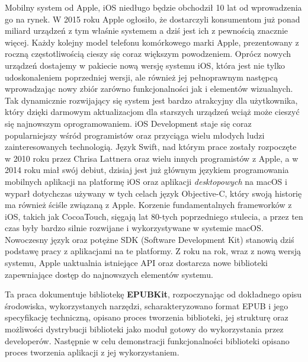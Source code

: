 Mobilny system od Apple, iOS niedługo będzie obchodził 10 lat od wprowadzenia go na rynek. W 2015 roku Apple ogłosiło, że dostarczyli konsumentom już ponad miliard urządzeń z tym właśnie systemem a dziś jest ich z pewnością znacznie więcej\cite{bilion-iphone}. Każdy kolejny model telefonu komórkowego marki Apple, prezentowany z roczną częstotliwością cieszy się coraz większym powodzeniem. Oprócz nowych urządzeń dostajemy w pakiecie nową wersję systemu iOS, która jest nie tylko udoskonaleniem poprzedniej wersji, ale również jej pełnoprawnym następcą wprowadzając nowy zbiór zarówno funkcjonalności jak i elementów wizualnych. Tak dynamicznie rozwijający się system jest bardzo atrakcyjny dla użytkownika, który dzięki darmowym aktualizacjom dla starszych urządzeń wciąż może cieszyć się najnowszym oprogramowaniem. iOS Development staje się coraz popularniejszy wśród programistów oraz przyciąga wielu młodych ludzi zainteresowanych technologią. Język Swift, nad którym prace zostały rozpoczęte w 2010 roku przez Chrisa Lattnera oraz wielu innych programistów z Apple, a w 2014 roku miał swój debiut, dzisiaj jest już głównym językiem programowania mobilnych aplikacji na platformę iOS oraz aplikacji \textit{desktopowych} na macOS i wyparł dotychczas używany w tych celach język Objective-C, który swoją historię ma również ściśle związaną z Apple. Korzenie fundamentalnych frameworków z iOS, takich jak CocoaTouch, sięgają lat 80-tych poprzedniego stulecia, a przez ten czas były bardzo silnie rozwijane i wykorzystywane w systemie macOS. Nowoczesny język oraz potężne SDK (Software Development Kit) stanowią dziś podstawę pracy z aplikacjami na te platformy. Z roku na rok, wraz z nową wersją systemu, Apple uaktualnia istniejące API oraz dostarcza nowe biblioteki zapewniające dostęp do najnowszych elementów systemu.

Ta praca dokumentuje bibliotekę \textbf{EPUBKit}, rozpoczynając od dokładnego opisu środowiska, wykorzystanych narzędzi, scharakteryzowano format EPUB i jego specyfikację techniczną, opisano proces tworzenia biblioteki, jej strukturę oraz możliwości dystrybucji biblioteki jako moduł gotowy do wykorzystania przez developerów. Następnie w celu demonstracji funkcjonalności biblioteki opisano proces tworzenia aplikacji z jej wykorzystaniem.
